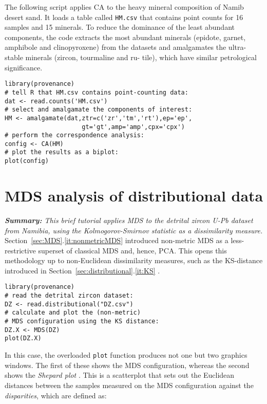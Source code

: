 \documentclass[11pt]{article}
\begin{document}
The following script applies CA to the heavy mineral composition of
Namib desert sand. It loads a table called \texttt{HM.csv} that
contains point counts for 16 samples and 15 minerals.  To reduce the
dominance of the least abundant components, the code extracts the most
abundant minerals (epidote, garnet, amphibole and clinopyroxene) from
the datasets and amalgamates the ultra-stable minerals (zircon,
tourmaline and ru- tile), which have similar petrological
significance.

\begin{verbatim}
library(provenance)
# tell R that HM.csv contains point-counting data:
dat <- read.counts('HM.csv')
# select and amalgamate the components of interest:
HM <- amalgamate(dat,ztr=c('zr','tm','rt'),ep='ep',
                     gt='gt',amp='amp',cpx='cpx')
# perform the correspondence analysis:
config <- CA(HM)
# plot the results as a biplot:
plot(config)
\end{verbatim}

\section{MDS analysis of distributional data}
\label{sec:DZMDS}

\textit{\textbf{Summary:} This brief tutorial applies MDS to the
  detrital zircon U-Pb dataset from Namibia, using the
  Kolmogorov-Smirnov statistic as a dissimilarity measure.}\\

Section~\ref{sec:MDS}.\ref{it:nonmetricMDS} introduced non-metric MDS
as a less-restrictive superset of classical MDS and, hence, PCA. This
opens this methodology up to non-Euclidean dissimilarity measures,
such as the KS-distance introduced in
Section~\ref{sec:distributional}.\ref{it:KS} \citep{vermeesch2013,
  vermeesch2018b}.

\begin{verbatim}
library(provenance)
# read the detrital zircon dataset:
DZ <- read.distributional("DZ.csv")
# calculate and plot the (non-metric)
# MDS configuration using the KS distance:
DZ.X <- MDS(DZ)
plot(DZ.X)
\end{verbatim}

In this case, the overloaded \texttt{plot} function produces not one
but two graphics windows. The first of these shows the MDS
configuration, whereas the second shows the \emph{Shepard plot}
\citep{shepard1962, kruskal1978}. This is a scatterplot that sets out
the Euclidean distances between the samples measured on the MDS
configuration against the \emph{disparities}, which are defined as:
\end{document}
